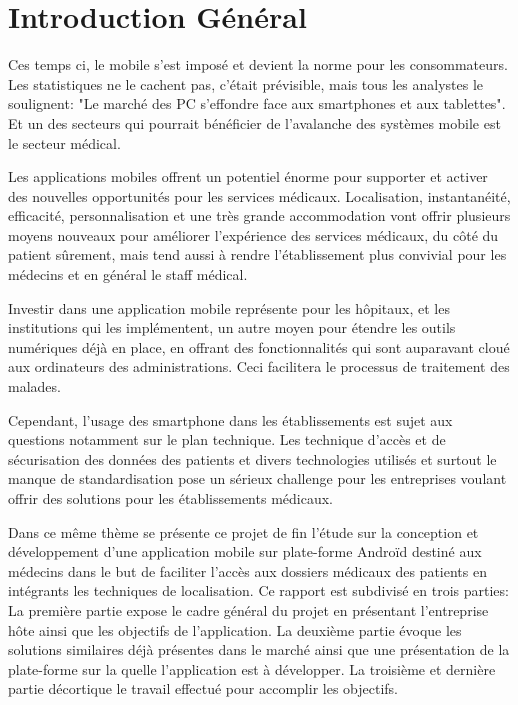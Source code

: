 
\chapter{Introduction Général}

Ces temps ci, le mobile s’est imposé et devient la norme pour les
consommateurs. Les statistiques ne le cachent pas, c’était prévisible,
mais tous les analystes le soulignent: "Le marché des PC s’effondre face
aux smartphones et aux tablettes"\cite{lefigaro}. Et un des secteurs qui
pourrait bénéficier de l'avalanche des systèmes mobile est le secteur
médical.

Les applications mobiles offrent un potentiel énorme pour supporter et
activer des nouvelles opportunités pour les services médicaux.
Localisation, instantanéité, efficacité, personnalisation et une très
grande accommodation vont offrir plusieurs moyens nouveaux pour
améliorer l’expérience des services médicaux, du côté du patient
sûrement, mais tend aussi à rendre l’établissement plus convivial pour
les médecins et en général le staff médical.

Investir dans une application mobile représente pour les hôpitaux, et
les institutions qui les implémentent, un autre moyen pour étendre les
outils numériques déjà en place, en offrant des fonctionnalités qui sont
auparavant cloué aux ordinateurs des administrations. Ceci  facilitera
le processus de traitement des malades.

Cependant, l’usage des smartphone dans les établissements est sujet aux
questions notamment sur le plan technique. Les technique d’accès et de
sécurisation des données des patients et divers technologies utilisés et
surtout le manque de standardisation pose un sérieux challenge pour les
entreprises voulant offrir des solutions pour les établissements
médicaux.

Dans ce même thème se présente ce projet de fin l’étude sur la
conception et développement d’une application mobile sur plate-forme
Androïd destiné aux médecins dans le but de faciliter l’accès aux
dossiers médicaux des patients en intégrants les techniques de
localisation. Ce rapport est subdivisé en trois parties: La première
partie expose le cadre général du projet en présentant l’entreprise hôte
ainsi que les objectifs de l’application. La deuxième partie évoque les
solutions similaires déjà présentes dans le marché ainsi que une
présentation de la plate-forme sur la quelle l’application est à
développer. La troisième et dernière partie décortique le travail
effectué pour accomplir les objectifs.
